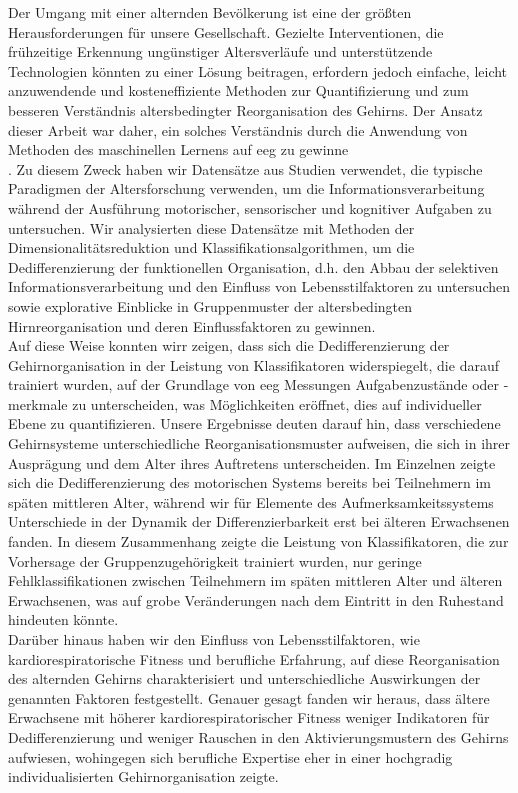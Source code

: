 Der Umgang mit einer alternden Bevölkerung ist eine der größten Herausforderungen für unsere Gesellschaft. Gezielte Interventionen, die frühzeitige Erkennung ungünstiger Altersverläufe und unterstützende Technologien könnten zu einer Lösung beitragen, erfordern jedoch einfache, leicht anzuwendende und kosteneffiziente Methoden zur Quantifizierung und zum besseren Verständnis altersbedingter Reorganisation des Gehirns. Der Ansatz dieser Arbeit war daher, ein solches Verständnis durch die Anwendung von Methoden des maschinellen Lernens auf \gls{eeg} zu gewinne\\.
Zu diesem Zweck haben wir Datensätze aus Studien verwendet, die typische Paradigmen der Altersforschung verwenden, um die Informationsverarbeitung während der Ausführung motorischer, sensorischer und kognitiver Aufgaben zu untersuchen. Wir analysierten diese Datensätze mit Methoden der Dimensionalitätsreduktion und Klassifikationsalgorithmen, um die Dedifferenzierung der funktionellen Organisation, d.h. den Abbau der selektiven Informationsverarbeitung und den Einfluss von Lebensstilfaktoren zu untersuchen sowie explorative Einblicke in Gruppenmuster der altersbedingten Hirnreorganisation und deren Einflussfaktoren zu gewinnen.\\
Auf diese Weise konnten wirr zeigen, dass sich die Dedifferenzierung der Gehirnorganisation in der Leistung von Klassifikatoren widerspiegelt, die darauf trainiert wurden, auf der Grundlage von \gls{eeg} Messungen Aufgabenzustände oder -merkmale zu unterscheiden, was Möglichkeiten eröffnet, dies auf individueller Ebene zu quantifizieren. Unsere Ergebnisse deuten darauf hin, dass verschiedene Gehirnsysteme unterschiedliche Reorganisationsmuster aufweisen, die sich in ihrer Ausprägung und dem Alter ihres Auftretens unterscheiden. Im Einzelnen zeigte sich die Dedifferenzierung des motorischen Systems bereits bei Teilnehmern im späten mittleren Alter, während wir für Elemente des Aufmerksamkeitssystems Unterschiede in der Dynamik der Differenzierbarkeit erst bei älteren Erwachsenen fanden. In diesem Zusammenhang zeigte die Leistung von Klassifikatoren, die zur Vorhersage der Gruppenzugehörigkeit trainiert wurden, nur geringe Fehlklassifikationen zwischen Teilnehmern im späten mittleren Alter und älteren Erwachsenen, was auf grobe Veränderungen nach dem Eintritt in den Ruhestand hindeuten könnte.\\
Darüber hinaus haben wir den Einfluss von Lebensstilfaktoren, wie kardiorespiratorische Fitness und berufliche Erfahrung, auf diese Reorganisation des alternden Gehirns charakterisiert und unterschiedliche Auswirkungen der genannten Faktoren festgestellt. Genauer gesagt fanden wir heraus, dass ältere Erwachsene mit höherer kardiorespiratorischer Fitness weniger Indikatoren für Dedifferenzierung und weniger Rauschen in den Aktivierungsmustern des Gehirns aufwiesen, wohingegen sich berufliche Expertise eher in einer hochgradig individualisierten Gehirnorganisation zeigte.\\

